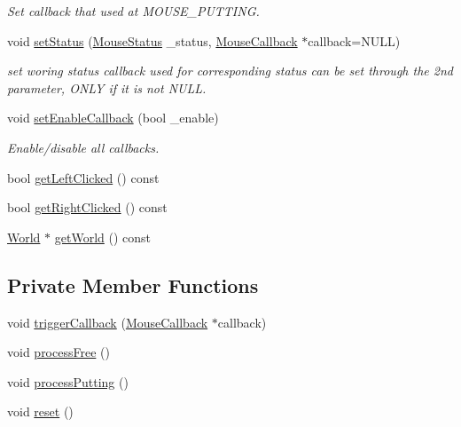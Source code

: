 \begin{DoxyCompactItemize}
\begin{DoxyCompactList}\small\item\em Set callback that used at M\+O\+U\+S\+E\+\_\+\+P\+U\+T\+T\+I\+N\+G. \end{DoxyCompactList}\item 
void \hyperlink{classMouseHandler_a8f252c03ffcfe43b09086a9f5201792b}{set\+Status} (\hyperlink{classMouseHandler_af967315727aa1d435d55cc704e64fd1a}{Mouse\+Status} \+\_\+status, \hyperlink{classMouseCallback}{Mouse\+Callback} $\ast$callback=N\+U\+L\+L)
\begin{DoxyCompactList}\small\item\em set woring status callback used for corresponding status can be set through the 2nd parameter, O\+N\+L\+Y if it is not N\+U\+L\+L. \end{DoxyCompactList}\item 
void \hyperlink{classMouseHandler_a3a64869cf23c6d979ce6ac4a0127a93e}{set\+Enable\+Callback} (bool \+\_\+enable)
\begin{DoxyCompactList}\small\item\em Enable/disable all callbacks. \end{DoxyCompactList}\item 
bool \hyperlink{classMouseHandler_ae0bda6b1555601ea331951e813848260}{get\+Left\+Clicked} () const 
\item 
bool \hyperlink{classMouseHandler_ac94dc769799b712128bc6af848d187e3}{get\+Right\+Clicked} () const 
\item 
\hyperlink{classWorld}{World} $\ast$ \hyperlink{classMouseHandler_a35f26398677136e135a72286f40e7f61}{get\+World} () const 
\end{DoxyCompactItemize}
\subsection*{Private Member Functions}
\begin{DoxyCompactItemize}
\item 
void \hyperlink{classMouseHandler_aafb50967285e8c1a453d45c35f888810}{trigger\+Callback} (\hyperlink{classMouseCallback}{Mouse\+Callback} $\ast$callback)
\item 
void \hyperlink{classMouseHandler_ac065172398b09cf5823d2b5ae739e8e0}{process\+Free} ()
\item 
void \hyperlink{classMouseHandler_ad9b30d8f27f8aa35cb9e4afb47f2dca3}{process\+Putting} ()
\item 
void \hyperlink{classMouseHandler_a8ec027e132bbeae8afd7c9716c92631b}{reset} ()
\end{DoxyCompactItemize}

